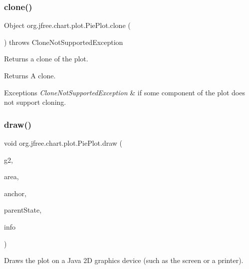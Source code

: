 \subsubsection{\texorpdfstring{clone()}{clone()}}
{\footnotesize\ttfamily Object org.\+jfree.\+chart.\+plot.\+Pie\+Plot.\+clone (\begin{DoxyParamCaption}{ }\end{DoxyParamCaption}) throws Clone\+Not\+Supported\+Exception}

Returns a clone of the plot.

\begin{DoxyReturn}{Returns}
A clone.
\end{DoxyReturn}

\begin{DoxyExceptions}{Exceptions}
{\em Clone\+Not\+Supported\+Exception} & if some component of the plot does not support cloning. \\
\hline
\end{DoxyExceptions}
\mbox{\label{classorg_1_1jfree_1_1chart_1_1plot_1_1_pie_plot_a80ab6a9db3c5ab6da9a3242b98b297d3}} 
\subsubsection{\texorpdfstring{draw()}{draw()}}
{\footnotesize\ttfamily void org.\+jfree.\+chart.\+plot.\+Pie\+Plot.\+draw (\begin{DoxyParamCaption}\item[{Graphics2D}]{g2,  }\item[{Rectangle2D}]{area,  }\item[{Point2D}]{anchor,  }\item[{\mbox{\hyperlink{classorg_1_1jfree_1_1chart_1_1plot_1_1_plot_state}{Plot\+State}}}]{parent\+State,  }\item[{\mbox{\hyperlink{classorg_1_1jfree_1_1chart_1_1plot_1_1_plot_rendering_info}{Plot\+Rendering\+Info}}}]{info }\end{DoxyParamCaption})}

Draws the plot on a Java 2D graphics device (such as the screen or a printer).


